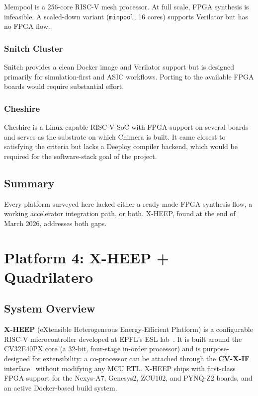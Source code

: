 \documentclass[journal]{IEEEtran}
\begin{document}
Mempool is a 256-core RISC-V mesh processor. At full scale, FPGA synthesis
is infeasible. A scaled-down variant (\texttt{minpool}, 16 cores) supports
Verilator but has no FPGA flow.

\subsubsection{Snitch Cluster}

Snitch provides a clean Docker image and Verilator support but is designed
primarily for simulation-first and ASIC workflows. Porting to the available
FPGA boards would require substantial effort.

\subsubsection{Cheshire}

Cheshire is a Linux-capable RISC-V SoC with FPGA support on several boards
and serves as the substrate on which Chimera is built. It came closest to
satisfying the criteria but lacks a Deeploy compiler backend, which would be
required for the software-stack goal of the project.

\subsection{Summary}

Every platform surveyed here lacked either a ready-made FPGA synthesis flow,
a working accelerator integration path, or both. X-HEEP, found at the end of March 2026,
addresses both gaps.

\section{Platform 4: X-HEEP + Quadrilatero}
\label{sec:xheep}

\subsection{System Overview}

\textbf{X-HEEP} (eXtensible Heterogeneous Energy-Efficient Platform) is a
configurable RISC-V microcontroller developed at EPFL's ESL
lab~\cite{xheep2023}. It is built around the CV32E40PX core (a 32-bit,
four-stage in-order processor) and is purpose-designed for extensibility:
a co-processor can be attached through the \textbf{CV-X-IF}
interface~\cite{cvxif_spec} without modifying any MCU RTL. X-HEEP ships
with first-class FPGA support for the Nexys-A7, Genesys2, ZCU102, and
PYNQ-Z2 boards, and an active Docker-based build system.
\end{document}
